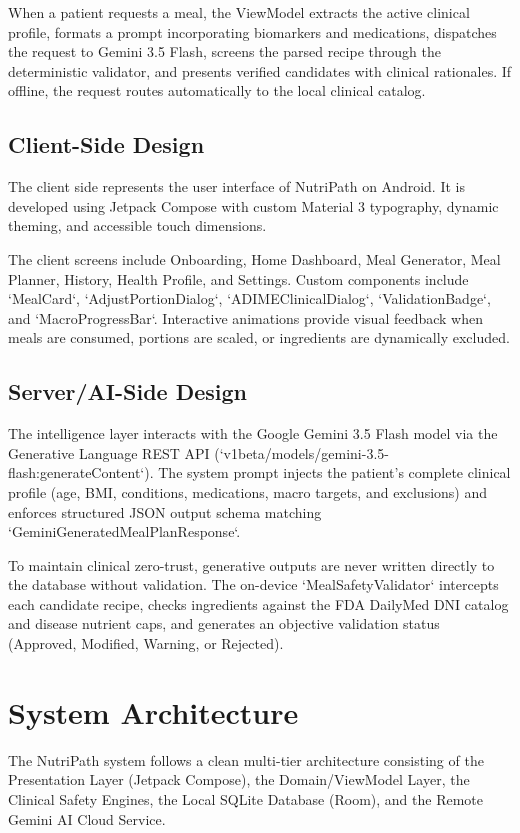 \documentclass[a4paper,12pt]{report}
\begin{document}
When a patient requests a meal, the ViewModel extracts the active clinical profile, formats a prompt incorporating biomarkers and medications, dispatches the request to Gemini 3.5 Flash, screens the parsed recipe through the deterministic validator, and presents verified candidates with clinical rationales. If offline, the request routes automatically to the local clinical catalog.

\subsection{Client-Side Design}
The client side represents the user interface of NutriPath on Android. It is developed using Jetpack Compose with custom Material 3 typography, dynamic theming, and accessible touch dimensions.

The client screens include Onboarding, Home Dashboard, Meal Generator, Meal Planner, History, Health Profile, and Settings. Custom components include `MealCard`, `AdjustPortionDialog`, `ADIMEClinicalDialog`, `ValidationBadge`, and `MacroProgressBar`. Interactive animations provide visual feedback when meals are consumed, portions are scaled, or ingredients are dynamically excluded.

\subsection{Server/AI-Side Design}
The intelligence layer interacts with the Google Gemini 3.5 Flash model via the Generative Language REST API (`v1beta/models/gemini-3.5-flash:generateContent`). The system prompt injects the patient's complete clinical profile (age, BMI, conditions, medications, macro targets, and exclusions) and enforces structured JSON output schema matching `GeminiGeneratedMealPlanResponse`.

To maintain clinical zero-trust, generative outputs are never written directly to the database without validation. The on-device `MealSafetyValidator` intercepts each candidate recipe, checks ingredients against the FDA DailyMed DNI catalog and disease nutrient caps, and generates an objective validation status (Approved, Modified, Warning, or Rejected).

\section{System Architecture}
The NutriPath system follows a clean multi-tier architecture consisting of the Presentation Layer (Jetpack Compose), the Domain/ViewModel Layer, the Clinical Safety Engines, the Local SQLite Database (Room), and the Remote Gemini AI Cloud Service.
\end{document}

